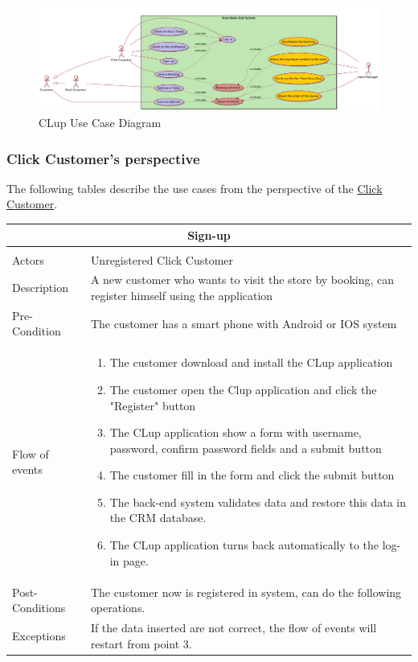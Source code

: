 \documentclass[a4paper,12pt]{report}
\begin{document}
\begin{figure}
	\includegraphics[angle=90,scale=0.17]{usecase_diagram.png}
	\centering
	\caption{CLup Use Case Diagram}
	\label{Use Case}
\end{figure}

\subsubsection{Click Customer’s perspective}
The following tables describe the use cases from the perspective of the  \hyperref[Definitions]{Click Customer}.
\begin{center}
	\begin{tabular}{p{}|p{}}
		\multicolumn{2}{c}{\large \textbf{Sign-up}} \\[3mm] 
		\hline \\
		Actors &  Unregistered Click Customer \\[3mm]
		Description & A new customer who wants to visit the store by booking, can register himself using the application  \\[3mm] 
		Pre-Condition & The  customer has a smart phone with Android or IOS system \\[3mm]
		Flow of events & 
		\begin{enumerate}
			\item The customer download and install the CLup application
			\item The customer open the Clup application and click the "Register" button
			\item The CLup application show a form with username, password, confirm password fields and a submit button
			\item The customer fill in the form and click the submit button
			\item The back-end system validates data and restore this data in the CRM database.
			\item The CLup application turns back automatically to the log-in page. 
		\end{enumerate}  \\[3mm]
	
		Post-Conditions & The customer now is registered in system, can do the following operations. \\[3mm]
		Exceptions & If the data inserted are not correct, the flow of events will restart from point 3.\\[3mm] 
	\end{tabular}
\end{center}
\end{document}
